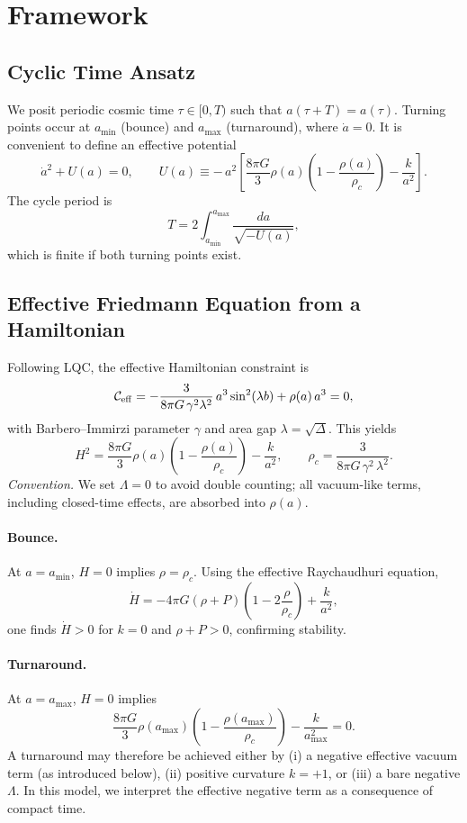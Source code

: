 \documentclass[12pt]{article}
\begin{document}
\section{Framework}
\subsection{Cyclic Time Ansatz}
We posit periodic cosmic time $\tau\in[0,T)$ such that $a(\tau+T)=a(\tau)$. Turning points
occur at $a_{\min}$ (bounce) and $a_{\max}$ (turnaround), where $\dot a=0$.
It is convenient to define an effective potential
\begin{equation}
\dot a^2 + U(a) = 0, \qquad
U(a) \equiv -\,a^2\!\left[\frac{8\pi G}{3}\rho(a)\left(1-\frac{\rho(a)}{\rho_c}\right)-\frac{k}{a^2}\right].
\end{equation}
The cycle period is
\begin{equation}
T = 2\int_{a_{\min}}^{a_{\max}}\frac{da}{\sqrt{-U(a)}},
\end{equation}
which is finite if both turning points exist.

\subsection{Effective Friedmann Equation from a Hamiltonian}
Following LQC, the effective Hamiltonian constraint is
\begin{equation}
\mathcal{C}_{\rm eff}
= -\frac{3}{8\pi G\,\gamma^2\lambda^2}\, a^3 \sin^2(\lambda b) + \rho(a)\,a^3 = 0,
\end{equation}
with Barbero--Immirzi parameter $\gamma$ and area gap $\lambda=\sqrt{\Delta}$.
This yields
\begin{equation}
H^2=\frac{8\pi G}{3}\rho(a)\left(1-\frac{\rho(a)}{\rho_c}\right)-\frac{k}{a^2}, \qquad
\rho_c=\frac{3}{8\pi G\,\gamma^2\,\lambda^2}.
\end{equation}
\textit{Convention.} We set $\Lambda=0$ to avoid double counting; all vacuum-like terms,
including closed-time effects, are absorbed into $\rho(a)$.

\paragraph{Bounce.}
At $a=a_{\min}$, $H=0$ implies $\rho=\rho_c$. Using the effective Raychaudhuri equation,
\[
\dot H = -4\pi G(\rho+P)\!\left(1-2\frac{\rho}{\rho_c}\right)+\frac{k}{a^2},
\]
one finds $\dot H>0$ for $k=0$ and $\rho+P>0$, confirming stability.

\paragraph{Turnaround.}
At $a=a_{\max}$, $H=0$ implies
\[
\frac{8\pi G}{3}\rho(a_{\max})\left(1-\frac{\rho(a_{\max})}{\rho_c}\right)-\frac{k}{a_{\max}^2}=0.
\]
A turnaround may therefore be achieved either by (i) a negative effective vacuum term
(as introduced below), (ii) positive curvature $k=+1$, or (iii) a bare negative $\Lambda$.
In this model, we interpret the effective negative term as a consequence of compact time.
\end{document}
